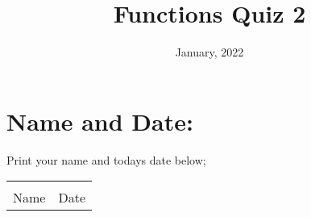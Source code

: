 \documentclass[12pt]{article} %
\title{Functions Quiz 2}
\date{January, 2022}
\begin{document}
    \renewcommand*{\coursecode}{MCR3U Quiz} %
    \renewcommand*{\assgnnumber}{2} %
    \renewcommand*{\submdate}{January, 2022} %
    \renewcommand*{\studentfname}{\textbf{Name:}} %
    \renewcommand*{\studentlname}{} %

    \renewcommand\qedsymbol{$\blacksquare$}
    \setfigpath
    \pagestyle{crowdmark}
    \fancyhfoffset[L,O]{0pt} %




	\maketitle
\section{Name and Date:}
	Print your name and todays date below;\\


	\begin{center}
	\noindent\begin{tabular}{ll}
		\makebox[3in]{\hrulefill} & \makebox[3in]{\hrulefill}\\
		Name & Date\\[8ex]%
	\end{tabular}
	\end{center}
	\newpage
\end{document}
